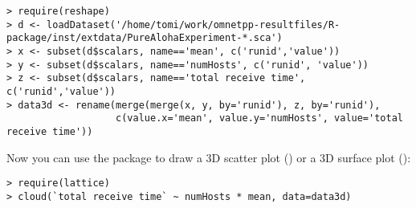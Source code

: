 \begin{verbatim}
> require(reshape)
> d <- loadDataset('/home/tomi/work/omnetpp-resultfiles/R-package/inst/extdata/PureAlohaExperiment-*.sca')
> x <- subset(d$scalars, name=='mean', c('runid','value'))
> y <- subset(d$scalars, name=='numHosts', c('runid', 'value'))
> z <- subset(d$scalars, name=='total receive time', c('runid','value'))
> data3d <- rename(merge(merge(x, y, by='runid'), z, by='runid'),
                   c(value.x='mean', value.y='numHosts', value='total receive time'))
\end{verbatim}

Now you can use the  package to draw a 3D scatter plot () or a
3D surface plot ():

\begin{verbatim}
> require(lattice)
> cloud(`total receive time` ~ numHosts * mean, data=data3d)
\end{verbatim}

